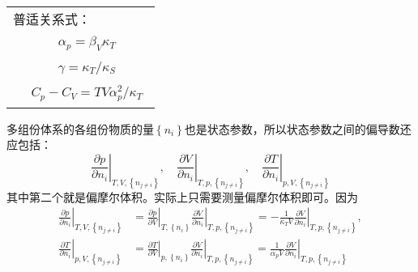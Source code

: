 \documentclass[main.tex]{subfiles}
\begin{document}
\begin{longtable}{m{}m{}}
    \multicolumn{2}{l}{{普适关系式：}}                                                                                                                                                                                                                                                                                              \\
                                                 & \begin{align}\alpha_p=\beta_V\kappa_T\end{align}                                                                                                                                                                                                                           \\ [-10ex]
                                                 & \begin{align}\gamma=\kappa_T/\kappa_S\end{align}                                                                                                                                                                                                                           \\[-10ex]
                                                 & \begin{align}C_p-C_V=TV\alpha_p^2/\kappa_T\end{align}                                                                                                                                                                                                                      \\ [-4ex]

    \hline
\end{longtable}

多组份体系的各组份物质的量$\left\{n_i\right\}$也是状态参数，所以状态参数之间的偏导数还应包括：
\[\left.\frac{\partial p}{\partial n_i}\right|_{T,V,\left\{n_{j\neq i}\right\}},\quad\left.\frac{\partial V}{\partial n_i}\right|_{T,p,\left\{n_{j\neq i}\right\}},\quad\left.\frac{\partial T}{\partial n_i}\right|_{p,V,\left\{n_{j\neq i}\right\}}\]
其中第二个就是偏摩尔体积。实际上只需要测量偏摩尔体积即可。因为
\begin{align*}
    \left.\frac{\partial p}{\partial n_i}\right|_{T,V,\left\{n_{j\neq i}\right\}} & =\left.\frac{\partial p}{\partial V}\right|_{T,\left\{n_i\right\}}\left.\frac{\partial V}{\partial n_i}\right|_{T,p,\left\{n_{j\neq i}\right\}}=-\frac{1}{\kappa_TV}\left.\frac{\partial V}{\partial n_i}\right|_{T,p,\left\{n_{j\neq i}\right\}}, \\
    \left.\frac{\partial T}{\partial n_i}\right|_{p,V,\left\{n_{j\neq i}\right\}} & =\left.\frac{\partial T}{\partial V}\right|_{p,\left\{n_i\right\}}\left.\frac{\partial V}{\partial n_i}\right|_{T,p,\left\{n_{j\neq i}\right\}}=\frac{1}{\alpha_p V}\left.\frac{\partial V}{\partial n_i}\right|_{T,p,\left\{n_{j\neq i}\right\}}
\end{align*}
\end{document}

